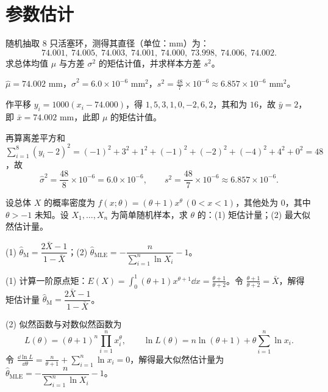 %
%
\section{参数估计}

\begin{exercise}
随机抽取 $8$ 只活塞环，测得其直径（单位：$\mathrm{mm}$）为：
\[
  74.001,\;74.005,\;74.003,\;74.001,\;74.000,\;73.998,\;74.006,\;74.002.
\]
求总体均值 $\mu$ 与方差 $\sigma^2$ 的矩估计值，并求样本方差 $s^2$。
\begin{answer}
$\hat{\mu}=74.002\text{ mm}$，$\hat{\sigma}^2=6.0\times 10^{-6}\text{ mm}^2$，$s^2=\frac{48}{7}\times 10^{-6}\approx 6.857\times 10^{-6}\text{ mm}^2$。
\end{answer}
\begin{solution}
作平移 $y_i=1000(x_i-74.000)$，得 $1,5,3,1,0,-2,6,2$，其和为 $16$，故 $\bar{y}=2$，即 $\bar{x}=74.002\text{ mm}$，此即 $\mu$ 的矩估计值。

再算离差平方和 $\sum_{i=1}^{8}(y_i-2)^2=(-1)^2+3^2+1^2+(-1)^2+(-2)^2+(-4)^2+4^2+0^2=48$，故
\[
  \hat{\sigma}^2=\frac{48}{8}\times 10^{-6}=6.0\times 10^{-6},\qquad
  s^2=\frac{48}{7}\times 10^{-6}\approx 6.857\times 10^{-6}.
\]
\end{solution}
\end{exercise}

\begin{exercise}
设总体 $X$ 的概率密度为 $f(x;\theta)=(\theta+1)x^\theta\,(0<x<1)$，其他处为 $0$，其中 $\theta>-1$ 未知。设 $X_1,\ldots,X_n$ 为简单随机样本，求 $\theta$ 的：(1) 矩估计量；(2) 最大似然估计量。
\begin{answer}
(1) $\hat{\theta}_{\mathrm{M}}=\dfrac{2\bar{X}-1}{1-\bar{X}}$；(2) $\hat{\theta}_{\mathrm{MLE}}=-\dfrac{n}{\sum_{i=1}^{n}\ln X_i}-1$。
\end{answer}
\begin{solution}
(1) 计算一阶原点矩：$E(X)=\int_{0}^{1}(\theta+1)x^{\theta+1}\dd x=\frac{\theta+1}{\theta+2}$。令 $\frac{\theta+1}{\theta+2}=\bar{X}$，解得矩估计量 $\hat{\theta}_{\mathrm{M}}=\dfrac{2\bar{X}-1}{1-\bar{X}}$。

(2) 似然函数与对数似然函数为
\[
  L(\theta)=(\theta+1)^n\prod_{i=1}^{n}x_i^\theta,\qquad
  \ln L(\theta)=n\ln(\theta+1)+\theta\sum_{i=1}^{n}\ln x_i.
\]
令 $\frac{\dd\ln L}{\dd\theta}=\frac{n}{\theta+1}+\sum_{i=1}^{n}\ln x_i=0$，解得最大似然估计量为 $\hat{\theta}_{\mathrm{MLE}}=-\dfrac{n}{\sum_{i=1}^{n}\ln X_i}-1$。
\end{solution}
\end{exercise}

